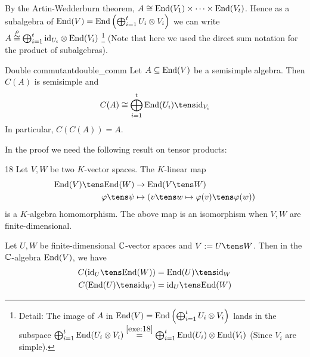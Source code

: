 \documentclass[twoside = false,	%
		headsepline,		%
		parskip = true,
		]{scrbook}						%
\begin{document}
        By the Artin-Wedderburn theorem, $A\cong \mathrm{End}(V_1) \times \dots \times \mathrm{End}(V_t)$. Hence as a subalgebra of $\mathrm{End}(V) = \mathrm{End}\left( \bigoplus_{i=1}^t U_i\otimes V_i\right)$ we can write $A \overset \rho \cong \bigoplus_{i=1}^t \mathrm{id}_{U_i} \otimes \mathrm{End}(V_i)$ \footnote{Detail: The image of $A$ in $\mathrm{End}(V)=\mathrm{End}\left( \bigoplus_{i=1}^t U_i\otimes V_i\right)$ lands in the subspace $\bigoplus_{i=1}^t \mathrm{End}(U_i \otimes V_i) \overset {\ref{exe:18}}= \bigoplus_{i=1}^t \mathrm{End}(U_i) \otimes \mathrm{End}(V_i)$ (Since $V_i$ are simple). } (Note that here we used the direct sum notation for the product of subalgebras).

        \begin{theorem}{Double commutant}{double_comm}
            Let $A \subseteq \mathrm{End}(V)$ be a semisimple algebra. Then $C(A)$ is semisimple and
            \begin{equation*}
                C(A) \cong \bigoplus_{i=1}^t \End(U_i) \tens \id_{V_i}
            \end{equation*}
            In particular, $C(C(A)) = A$.
        \end{theorem}

        In the proof we need the following result on tensor products:

        \begin{exercise}{}{18}
            Let $V, W$ be two $K$-vector spaces. The $K$-linear map
            \begin{equation*}
            \begin{split}
                \End(V) \tens \End(W) &\to \End(V \tens W) \\
                    \varphi \tens \psi &\mapsto (v \tens w \mapsto \varphi(v) \tens \varphi(w))
            \end{split}
            \end{equation*}
            is a $K$-algebra homomorphism. The above map is an isomorphism when $V,W$ are finite-dimensional.
        \end{exercise}

        \begin{claim*}{}
            Let $U,W$ be finite-dimensional $\mathbb C$-vector spaces and $V:= U \tens W$. Then in the $\mathbb C$-algebra $\mathrm{End}(V)$, we have
            \begin{equation*}
            \begin{split}
                C(\id_U \tens \End(W)) &= \End(U) \tens \id_W \\
                C(\End(U) \tens \id_W) &= \id_U \tens \End(W)
            \end{split}
            \end{equation*}
        \end{claim*}
\end{document}
